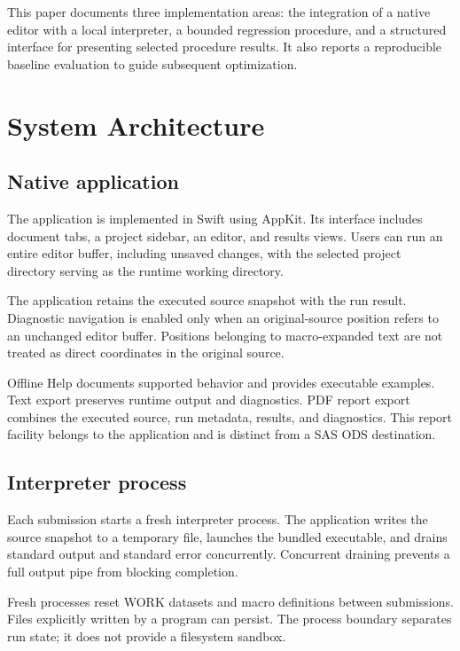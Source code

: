\documentclass[11pt,a4paper]{article}
\begin{document}
This paper documents three implementation areas: the integration
of a native editor with a local interpreter, a bounded regression
procedure, and a structured interface for presenting selected
procedure results. It also reports a reproducible baseline
evaluation to guide subsequent optimization.

\section{System Architecture}

\subsection{Native application}

The application is implemented in Swift using AppKit. Its
interface includes document tabs, a project sidebar, an editor,
and results views. Users can run an entire editor buffer,
including unsaved changes, with the selected project directory
serving as the runtime working directory.

The application retains the executed source snapshot with the
run result. Diagnostic navigation is enabled only when an
original-source position refers to an unchanged editor buffer.
Positions belonging to macro-expanded text are not treated as
direct coordinates in the original source.

Offline Help documents supported behavior and provides executable
examples. Text export preserves runtime output and diagnostics.
PDF report export combines the executed source, run metadata,
results, and diagnostics. This report facility belongs to the
application and is distinct from a SAS ODS destination.

\subsection{Interpreter process}

Each submission starts a fresh interpreter process. The
application writes the source snapshot to a temporary file,
launches the bundled executable, and drains standard output and
standard error concurrently. Concurrent draining prevents a full
output pipe from blocking completion.

Fresh processes reset WORK datasets and macro definitions between
submissions. Files explicitly written by a program can persist.
The process boundary separates run state; it does not provide a
filesystem sandbox.
\end{document}
